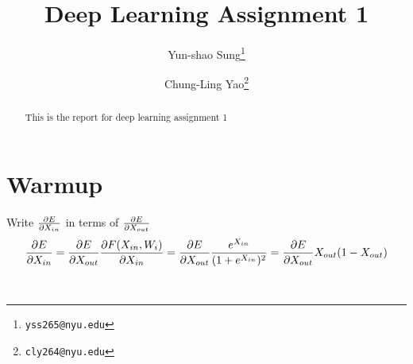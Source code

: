 \documentclass[final]{siamltexmm}
\title{Deep Learning Assignment 1}
\author{Yun-shao Sung\thanks{\tt yss265@nyu.edu}
        \and Chung-Ling Yao\thanks{\tt cly264@nyu.edu}}
\begin{document}
\maketitle

\begin{abstract}
This is the report for deep learning assignment 1
\end{abstract}

\pagestyle{myheadings}
\thispagestyle{plain}

\section{Warmup}
Write $\partial E \over \partial X_{in} $ in terms of $\partial E \over \partial X_{out} $
\begin{equation}
{\partial E\over \partial X_{in}} = {\partial E\over \partial X_{out}} {\partial F(X_{in}, W_i) \over \partial X_{in}} = {\partial E\over \partial X_{out}} {e^{X_{in}} \over (1+e^{X_{in}})^2} = {\partial E\over \partial X_{out}} X_{out} (1-X_{out})
\end{equation}

\\
\end{document}
